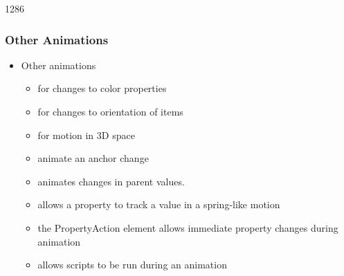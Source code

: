 %
%
%
%

\begin{slide}{1286}\frametitle{Other Animations}

\begin{itemize}
\item Other animations
  \begin{itemize}
  \item {} for changes to color properties
  \item {} for changes to orientation of items
  \item {} for motion in 3D space
  \item {} animate an anchor change
  \item {} animates changes in parent values.
  \item {} allows a property to track a value in a spring-like motion\\[3mm]
  \item {} the PropertyAction element allows
    immediate property changes during animation
  \item {} allows scripts to be run during an
    animation
  \end{itemize}
\end{itemize}

\end{slide}


